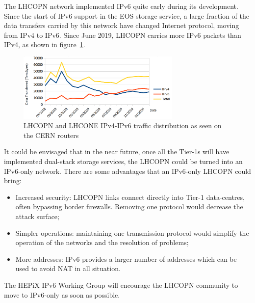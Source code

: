 
The LHCOPN network implemented IPv6 quite early during its development. 
Since the start of IPv6 support in the EOS storage service, a large fraction of the data transfers carried by this network have changed Internet protocol, moving from IPv4 to IPv6. Since June 2019, LHCOPN carries more IPv6 packets than IPv4, as shown in figure~\ref{fig:lhcopne-traffic}.

\begin{figure}[h]
\centering
\includegraphics[width=8cm]{lhcopne-traffic.png}
\caption{LHCOPN and LHCONE IPv4-IPv6 traffic distribution as seen on the CERN routers\cite{RefLHCOPNEv4v6}  }
\label{fig:lhcopne-traffic}
\end{figure}


It could be envisaged that in the near future, once all the Tier-1s will have implemented dual-stack storage services, the LHCOPN could be turned into an IPv6-only network. There are some advantages that an IPv6-only LHCOPN could bring:
\begin{itemize}
  \item Increased security: LHCOPN links connect directly into Tier-1 data-centres, often bypassing border firewalls. Removing one protocol would decrease the attack surface;
  \item Simpler operations: maintaining one transmission protocol would simplify the operation of the networks and the resolution of problems;
  \item More addresses: IPv6 provides a larger number of addresses which can be used to avoid NAT in all situation.
\end{itemize}

The HEPiX IPv6 Working Group will encourage the LHCOPN community to move to IPv6-only as soon as possible.




